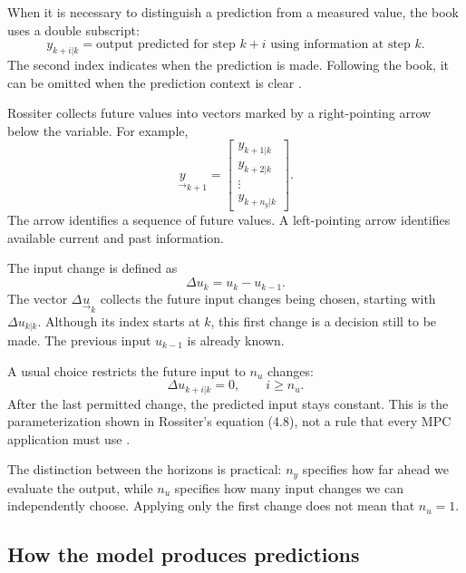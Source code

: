 When it is necessary to distinguish a prediction from a measured value, the book uses a double subscript:
\[
    y_{k+i|k}=\text{output predicted for step }k+i
                  \text{ using information at step }k.
\]
The second index indicates when the prediction is made. Following the book, it can be omitted when the prediction context is clear \cite[Section 2.3.3]{Rossiter2018}.

Rossiter collects future values into vectors marked by a right-pointing arrow below the variable. For example,
\begin{equation}
    \underset{\rightarrow}{y}_{k+1}=
    \begin{bmatrix}
        y_{k+1|k}\\y_{k+2|k}\\\vdots\\y_{k+n_y|k}
    \end{bmatrix}.
    \label{eq:mpc-future-output}
\end{equation}
The arrow identifies a sequence of future values. A left-pointing arrow identifies available current and past information.

The input change is defined as
\begin{equation}
    \Delta u_k=u_k-u_{k-1}.
\end{equation}
The vector $\Delta\underset{\rightarrow}{u}_k$ collects the future input changes being chosen, starting with $\Delta u_{k|k}$. Although its index starts at $k$, this first change is a decision still to be made. The previous input $u_{k-1}$ is already known.

A usual choice restricts the future input to $n_u$ changes:
\begin{equation}
    \Delta u_{k+i|k}=0,\qquad i\geq n_u.
    \label{eq:mpc-control-horizon}
\end{equation}
After the last permitted change, the predicted input stays constant. This is the parameterization shown in Rossiter's equation (4.8), not a rule that every MPC application must use \cite[Section 4.4.3]{Rossiter2018}.

The distinction between the horizons is practical: $n_y$ specifies how far ahead we evaluate the output, while $n_u$ specifies how many input changes we can independently choose. Applying only the first change does not mean that $n_u=1$.

\subsection{How the model produces predictions}

